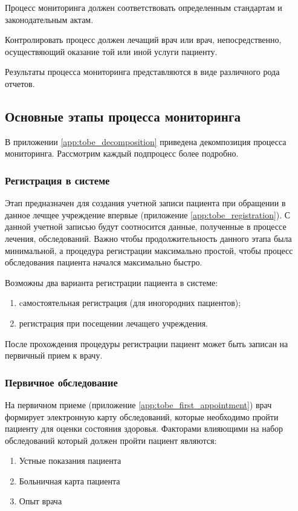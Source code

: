 Процесс мониторинга должен соответствовать определенным стандартам и
законодательным актам.

Контролировать процесс должен лечащий врач или врач, непосредственно,
осуществяющий оказание той или иной услуги пациенту.

Результаты процесса мониторинга представляются в виде различного рода отчетов.

\subsection{Основные этапы процесса мониторинга}

В приложении \ref{app:tobe_decomposition} приведена декомпозиция процесса
мониторинга. Рассмотрим каждый подпроцесс более подробно.

\subsubsection{Регистрация в системе}

Этап предназначен для создания учетной записи пациента при обращении в данное
лечщее учреждение впервые (приложение \ref{app:tobe_registration}). С данной учетной записью будут
соотносится данные, полученные в процессе лечения, обследований. Важно чтобы продолжительность
данного этапа была минимальной, а процедура регистрации максимально простой,
чтобы процесс обследования пациента начался максимально быстро.

Возможны два варианта регистрации пациента в системе:

\begin{enumerate}
  \item cамостоятельная регистрация (для иногородних пациентов);
  \item регистрация при посещении лечащего учреждения.
\end{enumerate}

После прохождения процедуры регистрации пациент может быть записан на первичный
прием к врачу.

\subsubsection{Первичное обследование}

На первичном приеме (приложение \ref{app:tobe_first_appointment}) врач формирует
электронную карту обследований, которые необходимо пройти пациенту для оценки
состояния здоровья. Факторами влияющими на набор обследований который должен
пройти пациент являются:
\begin{enumerate}
  \item Устные показания пациента
  \item Больничная карта пациента
  \item Опыт врача   
\end{enumerate}

